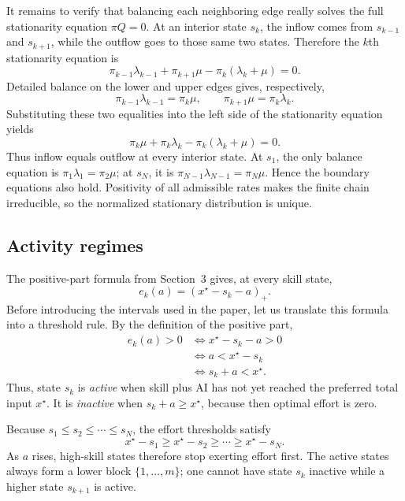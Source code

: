 \documentclass[11pt]{article}
\theoremstyle{tutorial}
\theoremstyle{remark}
\newcommand{\1}{\mathbb{I}}
\newcommand{\pos}[1]{\left(#1\right)_{+}}
\begin{document}
It remains to verify that balancing each neighboring edge really solves the full stationarity equation
$\pi Q=0$.  At an interior state $s_k$, the inflow comes from $s_{k-1}$ and $s_{k+1}$, while the outflow
goes to those same two states.  Therefore the $k$th stationarity equation is
\[
\pi_{k-1}\lambda_{k-1}+\pi_{k+1}\mu-\pi_k(\lambda_k+\mu)=0.
\]
Detailed balance on the lower and upper edges gives, respectively,
\[
  \pi_{k-1}\lambda_{k-1}=\pi_k\mu,
  \qquad
  \pi_{k+1}\mu=\pi_k\lambda_k.
\]
Substituting these two equalities into the left side of the stationarity equation yields
\[
  \pi_k\mu+\pi_k\lambda_k-\pi_k(\lambda_k+\mu)=0.
\]
Thus inflow equals outflow at every interior state.  At $s_1$, the only balance equation is
$\pi_1\lambda_1=\pi_2\mu$; at $s_N$, it is
$\pi_{N-1}\lambda_{N-1}=\pi_N\mu$.  Hence the boundary equations also hold.  Positivity of all admissible
rates makes the finite chain irreducible, so the normalized stationary distribution is unique.

\subsection{Activity regimes}

The positive-part formula from Section~3 gives, at every skill state,
\[
  e_k(a)=\pos{x^\star-s_k-a}.
\]
Before introducing the intervals used in the paper, let us translate this formula into a threshold rule.
By the definition of the positive part,
\begin{align*}
e_k(a)>0
&\iff x^\star-s_k-a>0\\
&\iff a<x^\star-s_k\\
&\iff s_k+a<x^\star.
\end{align*}
Thus, state $s_k$ is \emph{active} when skill plus AI has not yet reached the preferred total input
$x^\star$.  It is \emph{inactive} when $s_k+a\ge x^\star$, because then optimal effort is zero.

Because $s_1\le s_2\le\cdots\le s_N$, the effort thresholds satisfy
\[
  x^\star-s_1\ge x^\star-s_2\ge\cdots\ge x^\star-s_N.
\]
As $a$ rises, high-skill states therefore stop exerting effort first.  The active states always form a
lower block $\{1,\ldots,m\}$; one cannot have state $s_k$ inactive while a higher state $s_{k+1}$ is
active.
\end{document}
